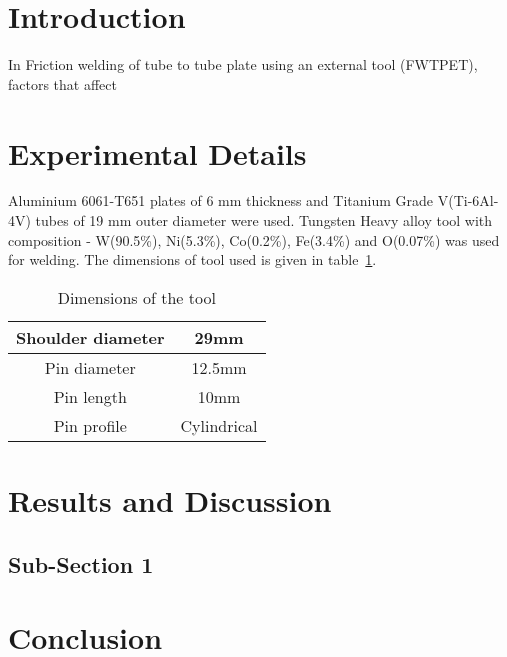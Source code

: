 \documentclass[3p,twocolumn]{elsarticle}
\begin{document}

\linenumbers
								
\section{Introduction}
\label{sec:Introduction}
In Friction welding of tube to tube plate using an external tool (FWTPET), factors that affect 

\section{Experimental Details} 
\label{sec:Experimental Details}
Aluminium 6061-T651 plates of 6 mm thickness and Titanium Grade V(Ti-6Al-4V) tubes of 19 mm outer diameter were used. Tungsten Heavy alloy tool with composition - W(90.5\%), Ni(5.3\%), Co(0.2\%), Fe(3.4\%) and O(0.07\%) was used for welding. The dimensions of tool used is given in table~\ref{tab:tool}.
\begin{table}[ht]
\caption{Dimensions of the tool}
\centering
\begin{tabular}{|c|c|}
\hline 
Shoulder diameter & 29mm \\ 
\hline 
Pin diameter & 12.5mm \\ 
\hline 
Pin length & 10mm \\ 
\hline 
Pin profile & Cylindrical \\ 
\hline 
\end{tabular} 
\label{tab:tool}
\end{table}

\section{Results and Discussion}
\label{sec:Results and Discussion}
\subsection{Sub-Section 1}

\section{Conclusion}
\label{sec:Conclusion}
\end{document}
